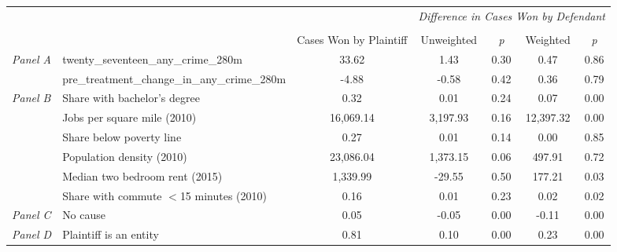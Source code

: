 \begin{tabular}{llccccc}
\toprule
 &  & \textit{} & \multicolumn{4}{c}{\textit{Difference in Cases Won by Defendant}} \\
\cline{4-7}
\\
 &  & Cases Won by Plaintiff & Unweighted & \emph{p} & Weighted & \emph{p} \\
\midrule
\multirow[c]{2}{3cm}{\textit{Panel A}} & twenty_seventeen_any_crime_280m & 33.62 & 1.43 & 0.30 & 0.47 & 0.86 \\
 & pre_treatment_change_in_any_crime_280m & -4.88 & -0.58 & 0.42 & 0.36 & 0.79 \\
\cline{1-7}
\multirow[c]{6}{3cm}{\textit{Panel B}} & Share with bachelor's degree & 0.32 & 0.01 & 0.24 & 0.07 & 0.00 \\
 & Jobs per square mile (2010) & 16,069.14 & 3,197.93 & 0.16 & 12,397.32 & 0.00 \\
 & Share below poverty line & 0.27 & 0.01 & 0.14 & 0.00 & 0.85 \\
 & Population density (2010) & 23,086.04 & 1,373.15 & 0.06 & 497.91 & 0.72 \\
 & Median two bedroom rent (2015) & 1,339.99 & -29.55 & 0.50 & 177.21 & 0.03 \\
 & Share with commute $<$15 minutes (2010) & 0.16 & 0.01 & 0.23 & 0.02 & 0.02 \\
\cline{1-7}
\textit{Panel C} & No cause & 0.05 & -0.05 & 0.00 & -0.11 & 0.00 \\
\cline{1-7}
\textit{Panel D} & Plaintiff is an entity & 0.81 & 0.10 & 0.00 & 0.23 & 0.00 \\
\cline{1-7}
\bottomrule
\end{tabular}
